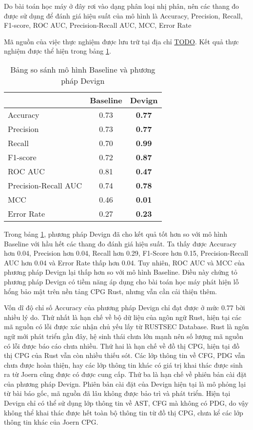 Do bài toán học máy ở đây rơi vào dạng phân loại nhị phân, nên các thang đo được sử dụng để đánh giá hiệu suất của mô hình là Accuracy, Precision, Recall, F1-score, ROC AUC, Precision-Recall AUC, MCC, Error Rate

Mã nguồn của việc thực nghiệm được lưu trữ tại địa chỉ \href{TODO}{TODO}.
Kết quả thực nghiệm được thể hiện trong bảng \ref{table:c4_ml}.

\begin{table}[H]
    \centering
    \caption{Bảng so sánh mô hình Baseline và phương pháp Devign}
    \label{table:c4_ml}
    \begin{tabular}{l @{\hskip 2cm} c @{\hskip 2cm} c}
        \hline
         & Baseline & Devign \\
        \hline
        Accuracy & 0.73 & \textbf{0.77} \\
        Precision & 0.73 & \textbf{0.77} \\
        Recall & 0.70 & \textbf{0.99} \\
        F1-score & 0.72 & \textbf{0.87} \\
        ROC AUC & 0.81 & \textbf{0.47} \\
        Precision-Recall AUC & 0.74 & \textbf{0.78} \\
        MCC & 0.46 & \textbf{0.01} \\
        Error Rate & 0.27 & \textbf{0.23} \\
        \hline
    \end{tabular}
\end{table}

Trong bảng \ref{table:c4_ml}, phương pháp Devign đã cho kết quả tốt hơn so với mô hình Baseline với hầu hết các thang đo đánh giá hiệu suất.
Ta thấy được Accuracy hơn 0.04, Precision hơn 0.04, Recall hơn 0.29, F1-Score hơn 0.15, Precision-Recall AUC hơn 0.04 và Error Rate thấp hơn 0.04.
Tuy nhiên, ROC AUC và MCC của phương pháp Devign lại thấp hơn so với mô hình Baseline.
Điều này chứng tỏ phương pháp Devign có tiềm năng áp dụng cho bài toán học máy phát hiện lỗ hổng bảo mật trên nền tảng CPG Rust, nhưng vẫn cần cải thiện thêm.

Vốn dĩ độ chỉ số Accuracy của phương pháp Devign chỉ đạt được ở mức 0.77 bời nhiều lý do.
Thứ nhất là hạn chế về bộ dữ liệu của ngôn ngữ Rust, hiện tại các mã nguồn có lỗi được xác nhận chủ yếu lấy từ RUSTSEC Database.
Rust là ngôn ngữ mới phát triển gần đây, hệ sinh thái chưa lớn mạnh nên số lượng mã nguồn có lỗi được báo cáo chưa nhiều.
Thứ hai là hạn chế về đồ thị CPG, hiện tại đồ thị CPG của Rust vẫn còn nhiều thiếu sót.
Các lớp thông tin về CFG, PDG vẫn chưa được hoàn thiện, hay các lớp thông tin khác có giá trị khai thác được sinh ra từ Joern cũng được có được cung cấp.
Thứ ba là hạn chế về phiên bản cài đặt của phương pháp Devign.
Phiên bản cài đặt của Devign hiện tại là mô phỏng lại từ bài báo gốc, mã nguồn đã lâu không được bảo trì và phát triển.
Hiện tại Devign chỉ có thể sử dụng lớp thông tin về AST, CFG mà không có PDG, do vậy không thể khai thác được hết toàn bộ thông tin từ đồ thị CPG, chưa kể các lớp thông tin khác của Joern CPG.

